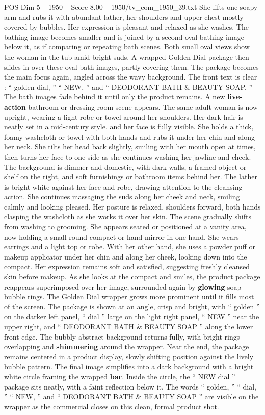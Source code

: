 \begin{textsample}{POS Dim 5 – 1950 – Score 8.00 – 1950/tv\_com\_1950\_39.txt}
She lifts one soapy arm and rubs it with abundant lather, her shoulders and upper chest mostly covered by bubbles.
Her expression is pleasant and relaxed as she washes.
The bathing image becomes smaller and is joined by a second oval bathing image below it, as if comparing or repeating bath scenes.
Both small oval views show the woman in the tub amid bright suds.
A wrapped Golden Dial package then slides in over these oval bath images, partly covering them.
The package becomes the main focus again, angled across the wavy background.
The front text is clear : “ golden dial, ” “ NEW, ” and “ DEODORANT BATH \& BEAUTY SOAP. ” The bath images fade behind it until only the product remains.
A new \textbf{live-action} bathroom or dressing-room scene appears.
The same adult woman is now upright, wearing a light robe or towel around her shoulders.
Her dark hair is neatly set in a mid-century style, and her face is fully visible.
She holds a thick, foamy washcloth or towel with both hands and rubs it under her chin and along her neck.
She tilts her head back slightly, smiling with her mouth open at times, then turns her face to one side as she continues washing her jawline and cheek.
The background is dimmer and domestic, with dark walls, a framed object or shelf on the right, and soft furnishings or bathroom items behind her.
The lather is bright white against her face and robe, drawing attention to the cleansing action.
She continues massaging the suds along her cheek and neck, smiling calmly and looking pleased.
Her posture is relaxed, shoulders forward, both hands clasping the washcloth as she works it over her skin.
The scene gradually shifts from washing to grooming.
She appears seated or positioned at a vanity area, now holding a small round compact or hand mirror in one hand.
She wears earrings and a light top or robe.
With her other hand, she uses a powder puff or makeup applicator under her chin and along her cheek, looking down into the compact.
Her expression remains soft and satisfied, suggesting freshly cleansed skin before makeup.
As she looks at the compact and smiles, the product package reappears superimposed over her image, surrounded again by \textbf{glowing} soap-bubble rings.
The Golden Dial wrapper grows more prominent until it fills most of the screen.
The package is shown at an angle, crisp and bright, with “ golden ” on the darker left panel, “ dial ” large on the light right panel, “ NEW ” near the upper right, and “ DEODORANT BATH \& BEAUTY SOAP ” along the lower front edge.
The bubbly abstract background returns fully, with bright rings overlapping and \textbf{shimmering} around the wrapper.
Near the end, the package remains centered in a product display, slowly shifting position against the lively bubble pattern.
The final image simplifies into a dark background with a bright white circle framing the wrapped \textbf{bar}.
Inside the circle, the “ NEW dial ” package sits neatly, with a faint reflection below it.
The words “ golden, ” “ dial, ” “ NEW, ” and “ DEODORANT BATH \& BEAUTY SOAP ” are visible on the wrapper as the commercial closes on this clean, formal product shot.

\end{textsample}
